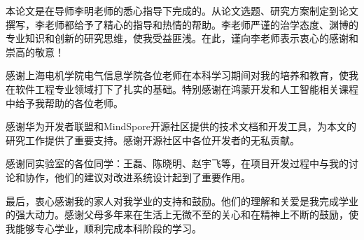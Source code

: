 \begin{acknowledgements}
	本论文是在导师李明老师的悉心指导下完成的。从论文选题、研究方案制定到论文撰写，李老师都给予了精心的指导和热情的帮助。李老师严谨的治学态度、渊博的专业知识和创新的研究思维，使我受益匪浅。在此，谨向李老师表示衷心的感谢和崇高的敬意！

	感谢上海电机学院电气信息学院各位老师在本科学习期间对我的培养和教育，使我在软件工程专业领域打下了扎实的基础。特别感谢在鸿蒙开发和人工智能相关课程中给予我帮助的各位老师。

	感谢华为开发者联盟和MindSpore开源社区提供的技术文档和开发工具，为本文的研究工作提供了重要支持。感谢开源社区中各位开发者的无私贡献。

	感谢同实验室的各位同学：王磊、陈晓明、赵宇飞等，在项目开发过程中与我的讨论和协作，他们的建议对改进系统设计起到了重要作用。

	最后，衷心感谢我的家人对我学业的支持和鼓励。他们的理解和关爱是我完成学业的强大动力。感谢父母多年来在生活上无微不至的关心和在精神上不断的鼓励，使我能够专心学业，顺利完成本科阶段的学习。
\end{acknowledgements}